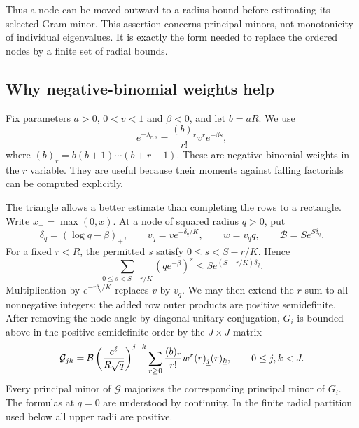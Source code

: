 Thus a node can be moved outward to a radius bound before estimating its selected Gram minor. This assertion concerns principal minors, not monotonicity of individual eigenvalues. It is exactly the form needed to replace the ordered nodes by a finite set of radial bounds.

\subsection{Why negative-binomial weights help}
Fix parameters $a>0$, $0<v<1$ and $\beta<0$, and let $b=aR$. We use
\begin{equation}\label{eq:row-weights}
 e^{-\lambda_{r,s}}=\frac{(b)_r}{r!}v^r e^{-\beta s},
\end{equation}
where $(b)_r=b(b+1)\cdots(b+r-1)$. These are negative-binomial weights in the $r$ variable. They are useful because their moments against falling factorials can be computed explicitly.

The triangle allows a better estimate than completing the rows to a rectangle. Write $x_+=\max(0,x)$. At a node of squared radius $q>0$, put
\[
 \delta_q=(\log q-\beta)_+,\qquad v_q=v e^{-\delta_q/K},
 \qquad w=v_qq,\qquad \mathcal B=S e^{S\delta_q}.
\]
For a fixed $r<R$, the permitted $s$ satisfy $0\leq s<S-r/K$. Hence
\begin{equation}\label{eq:triangular-tilt}
 \sum_{0\leq s<S-r/K}(qe^{-\beta})^s
 \leq S e^{(S-r/K)\delta_q}.
\end{equation}
Multiplication by $e^{-r\delta_q/K}$ replaces $v$ by $v_q$. We may then extend the $r$ sum to all nonnegative integers: the added row outer products are positive semidefinite. After removing the node angle by diagonal unitary conjugation, $G_i$ is
bounded above in the positive semidefinite order by the $J\times J$ matrix
\begin{equation}\label{eq:moment-matrix}
 \mathcal G_{jk}
 =\mathcal B\left(\frac{e^\ell}{R\sqrt q}\right)^{j+k}
 \sum_{r\geq0}\frac{(b)_r}{r!}w^r(r)_{\underline{j}}(r)_{\underline{k}},
 \qquad 0\leq j,k<J.
\end{equation}
Every principal minor of $\mathcal G$ majorizes the corresponding principal
minor of $G_i$. The formulas at $q=0$ are understood by continuity. In the
finite radial partition used below all upper radii are positive.

